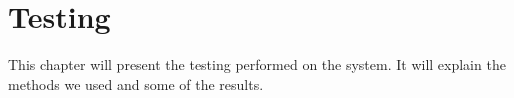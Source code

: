 \chapter{Testing}
This chapter will present the testing performed on the system. It will explain the methods we used and some of the results.




